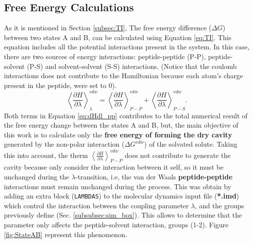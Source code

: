 \subsection{Free Energy Calculations}

As it is mentioned in Section \ref{subsec:TI}, The free energy difference ($\Delta G$) between two states A and B, can be calculated using Equation \ref{eq:TI}. This equation includes all the potential interactions present in the system. In this case, there are two sources of energy interactions: peptide-peptide (P-P), peptide-solvent (P-S) and solvent-solvent (S-S) interactions. (Notice that the coulomb interactions does not contribute to the Hamiltonian because each atom's charge present in the peptide, were set to 0). 
\begin{equation}
    \left \langle \frac{\partial H}{\partial\lambda} \right \rangle^{vdw}_{\lambda} = \left \langle \frac{\partial H}{\partial\lambda} \right \rangle^{vdw}_{P-P} + \left \langle \frac{\partial H}{\partial\lambda} \right \rangle^{vdw}_{P-S}.
    \label{eq:dHdl_pp}
\end{equation}
Both terms in Equation \ref{eq:dHdl_pp} contributes to the total numerical result of the free energy change between the states A and B, but, the main objective of this work is to calculate only the \textbf{free energy of forming the dry cavity} generated by the non-polar interaction ($\Delta G^{vdw}$) of the solvated solute. Taking this into account, the therm $\left \langle \frac{\partial H}{\partial\lambda} \right \rangle^{vdw}_{P-P}$ does not contribute to generate the cavity because only consider the interaction between it self, so it must be unchanged during the $\lambda$-transition, i.e, the van der Waals \textbf{peptide-peptide} interactions must remain unchanged during the process. 
This was obtain by adding an extra block (\texttt{LAMBDAS}) to the molecular dynamics input file (\textbf{*.imd}) which control the interaction between the coupling parameter $\lambda$, and the groups previously define (Sec. \ref{subsubsec:sim_box}). This allows to determine that the parameter only affects the peptide-solvent interaction, groups (1-2). Figure \ref{fig:StateAB} represent this phenomenon. 

